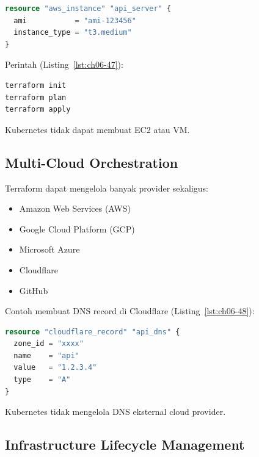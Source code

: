 \begin{lstlisting}[language=terraform, caption={Potongan kode Terraform pada Provisioning Infrastruktur Cloud}, label={lst:ch06-46}]
resource "aws_instance" "api_server" {
  ami           = "ami-123456"
  instance_type = "t3.medium"
}
\end{lstlisting}

Perintah (Listing~\ref{lst:ch06-47}):

\begin{lstlisting}[language=bash, caption={Menyiapkan direktori kerja Terraform}, label={lst:ch06-47}]
terraform init
terraform plan
terraform apply
\end{lstlisting}

Kubernetes tidak dapat membuat EC2 atau VM.

\subsection{Multi-Cloud Orchestration}

Terraform dapat mengelola banyak provider sekaligus:

\begin{itemize}
    \item Amazon Web Services (AWS)
    \item Google Cloud Platform (GCP)
    \item Microsoft Azure
    \item Cloudflare
    \item GitHub
\end{itemize}

Contoh membuat DNS record di Cloudflare (Listing~\ref{lst:ch06-48}):

\begin{lstlisting}[language=terraform, caption={Potongan kode Terraform pada Multi-Cloud Orchestration}, label={lst:ch06-48}]
resource "cloudflare_record" "api_dns" {
  zone_id = "xxxx"
  name    = "api"
  value   = "1.2.3.4"
  type    = "A"
}
\end{lstlisting}

Kubernetes tidak mengelola DNS eksternal cloud provider.

\subsection{Infrastructure Lifecycle Management}

